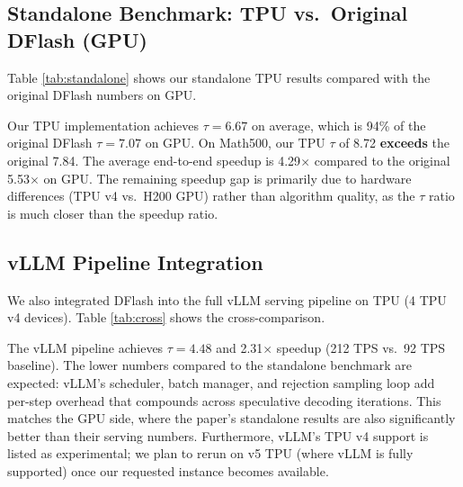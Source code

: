 \documentclass[12pt,letterpaper]{article}
\begin{document}
\subsection{Standalone Benchmark: TPU vs.\ Original DFlash (GPU)}

Table \ref{tab:standalone} shows our standalone TPU results compared with the original DFlash numbers on GPU.

\begin{table}[htbp]
\caption{Standalone benchmark results: TPU (single v4 device, JAX) vs.\ original DFlash on GPU (H200, PyTorch). $\tau$ = average acceptance length, Speedup = wall-clock ratio over autoregressive baseline, TPS = tokens per second.}
\label{tab:standalone}
\resizebox{\linewidth}{!}{}
\end{table}

Our TPU implementation achieves $\tau=6.67$ on average, which is 94\% of the original DFlash $\tau=7.07$ on GPU. On Math500, our TPU $\tau$ of 8.72 \textbf{exceeds} the original 7.84. The average end-to-end speedup is 4.29$\times$ compared to the original 5.53$\times$ on GPU. The remaining speedup gap is primarily due to hardware differences (TPU v4 vs.\ H200 GPU) rather than algorithm quality, as the $\tau$ ratio is much closer than the speedup ratio.

\subsection{vLLM Pipeline Integration}

We also integrated DFlash into the full vLLM serving pipeline on TPU (4 TPU v4 devices). Table \ref{tab:cross} shows the cross-comparison.

\begin{table}[htbp]
\caption{Cross-comparison: standalone TPU, vLLM pipeline TPU, and original DFlash (GPU). The vLLM pipeline shows lower speedup due to scheduling and batch management overhead, not algorithm quality.}
\label{tab:cross}
\resizebox{\linewidth}{!}{}
\end{table}

The vLLM pipeline achieves $\tau=4.48$ and 2.31$\times$ speedup (212 TPS vs.\ 92 TPS baseline). The lower numbers compared to the standalone benchmark are expected: vLLM's scheduler, batch manager, and rejection sampling loop add per-step overhead that compounds across speculative decoding iterations. This matches the GPU side, where the paper's standalone results are also significantly better than their serving numbers. Furthermore, vLLM's TPU v4 support is listed as experimental; we plan to rerun on v5 TPU (where vLLM is fully supported) once our requested instance becomes available.
\end{document}
